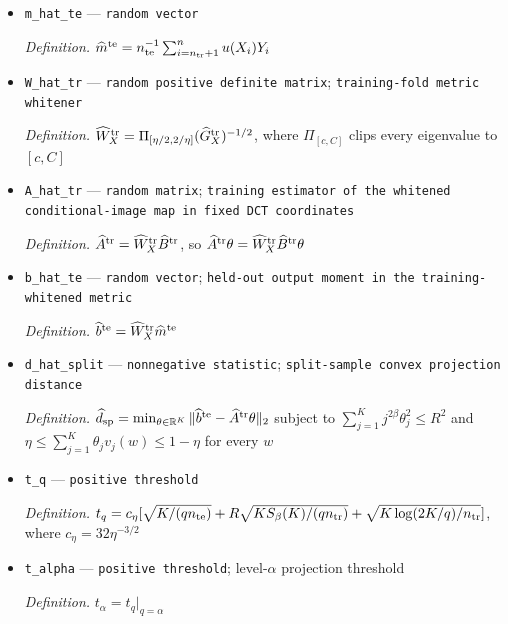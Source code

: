 \documentclass{article}
\begin{document}
\begin{itemize}
  \item \texttt{m\_\allowbreak{}hat\_\allowbreak{}te} --- \texttt{random vector}
  \par\smallskip\noindent\emph{Definition.} \(\widehat m^{\rm te}=n_{\rm te}^{-1}\sum_{i=n_{\rm tr}+1}^{n}u(X_i)Y_i\)
  \item \texttt{W\_\allowbreak{}hat\_\allowbreak{}tr} --- \texttt{random positive definite matrix}; \texttt{training-\allowbreak{}fold metric whitener}
  \par\smallskip\noindent\emph{Definition.} \(\widehat W_X^{\rm tr}=\Pi_{[\eta/2,2/\eta]}(\widehat G_X^{\rm tr})^{-1/2}\), where \(\Pi_{[c,C]}\) clips every eigenvalue to \([c,C]\)
  \item \texttt{A\_\allowbreak{}hat\_\allowbreak{}tr} --- \texttt{random matrix}; \texttt{training estimator of the whitened conditional-\allowbreak{}image map in fixed DCT coordinates}
  \par\smallskip\noindent\emph{Definition.} \(\widehat A^{\rm tr}=\widehat W_X^{\rm tr}\widehat B^{\rm tr}\), so \(\widehat A^{\rm tr}\theta=\widehat W_X^{\rm tr}\widehat B^{\rm tr}\theta\)
  \item \texttt{b\_\allowbreak{}hat\_\allowbreak{}te} --- \texttt{random vector}; \texttt{held-\allowbreak{}out output moment in the training-\allowbreak{}whitened metric}
  \par\smallskip\noindent\emph{Definition.} \(\widehat b^{\rm te}=\widehat W_X^{\rm tr}\widehat m^{\rm te}\)
  \item \texttt{d\_\allowbreak{}hat\_\allowbreak{}split} --- \texttt{nonnegative statistic}; \texttt{split-\allowbreak{}sample convex projection distance}
  \par\smallskip\noindent\emph{Definition.} \(\widehat d_{\rm sp}=\min_{\theta\in\mathbb R^K}\|\widehat b^{\rm te}-\widehat A^{\rm tr}\theta\|_2\) subject to \(\sum_{j=1}^Kj^{2\beta}\theta_j^2\le R^2\) and \(\eta\le\sum_{j=1}^K\theta_jv_j(w)\le1-\eta\) for every \(w\)
  \item \texttt{t\_\allowbreak{}q} --- \texttt{positive threshold}
  \par\smallskip\noindent\emph{Definition.} \(t_q=c_\eta[\sqrt{K/(q n_{\rm te})}+R\sqrt{KS_\beta(K)/(q n_{\rm tr})}+\sqrt{K\log(2K/q)/n_{\rm tr}}]\), where \(c_\eta=32\eta^{-3/2}\)
  \item \texttt{t\_\allowbreak{}alpha} --- \texttt{positive threshold}; level-\(\alpha\) projection threshold
  \par\smallskip\noindent\emph{Definition.} \(t_\alpha=t_q\vert_{q=\alpha}\)

\end{itemize}
\end{document}
